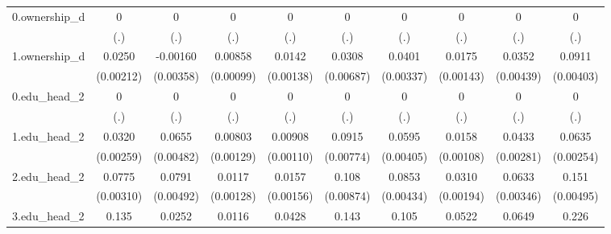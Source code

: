\begin{table}[htbp]
\begin{tabular}{l*{9}{c}}
0.ownership\_d&           0         &           0         &           0         &           0         &           0         &           0         &           0         &           0         &           0         \\
            &         (.)         &         (.)         &         (.)         &         (.)         &         (.)         &         (.)         &         (.)         &         (.)         &         (.)         \\
1.ownership\_d&      0.0250\sym{***}&    -0.00160         &     0.00858\sym{***}&      0.0142\sym{***}&      0.0308\sym{***}&      0.0401\sym{***}&      0.0175\sym{***}&      0.0352\sym{***}&      0.0911\sym{***}\\
            &   (0.00212)         &   (0.00358)         &   (0.00099)         &   (0.00138)         &   (0.00687)         &   (0.00337)         &   (0.00143)         &   (0.00439)         &   (0.00403)         \\
0.edu\_head\_2&           0         &           0         &           0         &           0         &           0         &           0         &           0         &           0         &           0         \\
            &         (.)         &         (.)         &         (.)         &         (.)         &         (.)         &         (.)         &         (.)         &         (.)         &         (.)         \\
1.edu\_head\_2&      0.0320\sym{***}&      0.0655\sym{***}&     0.00803\sym{***}&     0.00908\sym{***}&      0.0915\sym{***}&      0.0595\sym{***}&      0.0158\sym{***}&      0.0433\sym{***}&      0.0635\sym{***}\\
            &   (0.00259)         &   (0.00482)         &   (0.00129)         &   (0.00110)         &   (0.00774)         &   (0.00405)         &   (0.00108)         &   (0.00281)         &   (0.00254)         \\
2.edu\_head\_2&      0.0775\sym{***}&      0.0791\sym{***}&      0.0117\sym{***}&      0.0157\sym{***}&       0.108\sym{***}&      0.0853\sym{***}&      0.0310\sym{***}&      0.0633\sym{***}&       0.151\sym{***}\\
            &   (0.00310)         &   (0.00492)         &   (0.00128)         &   (0.00156)         &   (0.00874)         &   (0.00434)         &   (0.00194)         &   (0.00346)         &   (0.00495)         \\
3.edu\_head\_2&       0.135\sym{***}&      0.0252\sym{***}&      0.0116\sym{***}&      0.0428\sym{***}&       0.143\sym{***}&       0.105\sym{***}&      0.0522\sym{***}&      0.0649\sym{***}&       0.226\sym{***}\\

\end{tabular}
\end{table}
